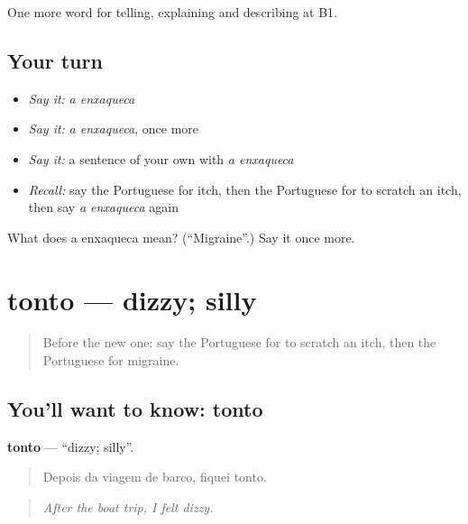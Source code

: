 \begin{grammarlens}[title={What you've built}]
One more word for telling, explaining and describing at B1.
\end{grammarlens}

\subsection*{Your turn}
\begin{itemize}
\raggedright
  \item \emph{Say it:} \emph{a enxaqueca}
  \item \emph{Say it:} \emph{a enxaqueca}, once more
  \item \emph{Say it:} a sentence of your own with \emph{a enxaqueca}
  \item \emph{Recall:} say the Portuguese for itch, then the Portuguese for to scratch an itch, then say \emph{a enxaqueca} again
\end{itemize}

\begin{tcolorbox}[breakable,colback=teal!4,colframe=teal!35!black,title={Before you move on}]
What does a enxaqueca mean? (\textquotedblleft{}Migraine\textquotedblright{}.) Say it once more.
\end{tcolorbox}
\section[tonto]{tonto — dizzy; silly}

\label{lesson:PT-C484-tonto}



\begin{quote}
Before the new one: say the Portuguese for to scratch an itch, then the Portuguese for migraine.
\end{quote}

\subsection*{You'll want to know: tonto}
\textbf{tonto} — \textquotedblleft{}dizzy; silly\textquotedblright{}.

\begin{quote}
Depois da viagem de barco, fiquei tonto.
\end{quote}

\begin{quote}
\emph{After the boat trip, I felt dizzy.}
\end{quote}

